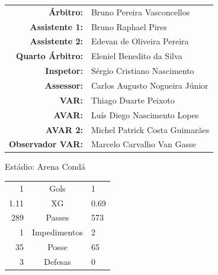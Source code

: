 \documentclass[11pt]{article}
\begin{document}
\vspace{0.5cm}
\begin{minipage}{0.65\textwidth}
\begin{center}
\begin{tabular}{rl}
\textbf{Árbitro:} & Bruno Pereira Vasconcellos \\
\textbf{Assistente 1:} & Bruno Raphael Pires \\
\textbf{Assistente 2:} & Edevan de Oliveira Pereira \\
\textbf{Quarto Árbitro:} & Eleniel Benedito da Silva \\
\textbf{Inspetor:} & Sérgio Cristiano Nascimento \\
\textbf{Assessor:} & Carlos Augusto Nogueira Júnior \\
\textbf{VAR:} & Thiago Duarte Peixoto \\
\textbf{AVAR:} & Luís Diego Nascimento Lopes \\
\textbf{AVAR 2:} & Michel Patrick Costa Guimarães \\
\textbf{Observador VAR:} & Marcelo Carvalho Van Gasse \\
\end{tabular}
\end{center}
\end{minipage}
\begin{minipage}{0.3\textwidth}
Estádio: Arena Condá\\
\begin{tabular}{rcl}
1 & Gols & 1 \\
1.11 & XG & 0.69 \\
289 & Passes & 573 \\
1 & Impedimentos & 2 \\
35 & Posse & 65 \\
3 & Defesas & 0 \\
\end{tabular}
\end{minipage}
\newpage
\end{document}
